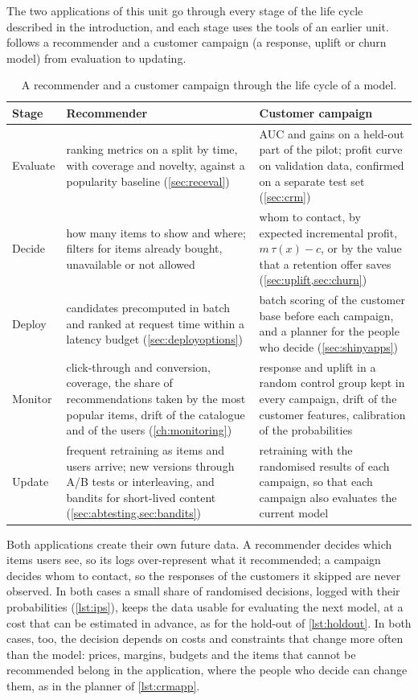 The two applications of this unit go through every stage of the life cycle described in the
introduction, and each stage uses the tools of an earlier unit.  follows a
recommender and a customer campaign (a response, uplift or churn model) from evaluation to updating.

\begin{table}[htbp]
\centering\small
\caption{A recommender and a customer campaign through the life cycle of a model.}\label{tab:applifecycle}
\begin{tabularx}{\textwidth}{@{}>{\raggedright\arraybackslash}p{1.6cm}>{\raggedright\arraybackslash}X>{\raggedright\arraybackslash}X@{}}
\toprule
Stage & Recommender & Customer campaign\\
\midrule
Evaluate & ranking metrics on a split by time, with coverage and novelty, against a popularity baseline
(\cref{sec:receval}) & AUC and gains on a held-out part of the pilot; profit curve on validation data,
confirmed on a separate test set (\cref{sec:crm})\\
Decide & how many items to show and where; filters for items already bought, unavailable or not allowed &
whom to contact, by expected incremental profit, $m\,\tau(x)-c$, or by the value that a retention offer
saves (\cref{sec:uplift,sec:churn})\\
Deploy & candidates precomputed in batch and ranked at request time within a latency budget
(\cref{sec:deployoptions}) & batch scoring of the customer base before each campaign, and a planner for
the people who decide (\cref{sec:shinyapps})\\
Monitor & click-through and conversion, coverage, the share of recommendations taken by the most popular
items, drift of the catalogue and of the users (\cref{ch:monitoring}) & response and uplift in a random
control group kept in every campaign, drift of the customer features, calibration of the probabilities\\
Update & frequent retraining as items and users arrive; new versions through A/B tests or interleaving,
and bandits for short-lived content (\cref{sec:abtesting,sec:bandits}) & retraining with the randomised
results of each campaign, so that each campaign also evaluates the current model\\
\bottomrule
\end{tabularx}
\end{table}

Both applications create their own future data. A recommender decides which items users see, so its logs
over-represent what it recommended; a campaign decides whom to contact, so the responses of the customers
it skipped are never observed. In both cases a small share of randomised decisions, logged with their
probabilities (\cref{lst:ips}), keeps the data usable for evaluating the next model, at a cost that can be
estimated in advance, as for the hold-out of \cref{lst:holdout}. In both cases, too, the decision depends on
costs and constraints that change more often than the model: prices, margins, budgets and the items that
cannot be recommended belong in the application, where the people who decide can change them, as in the
planner of \cref{lst:crmapp}.


